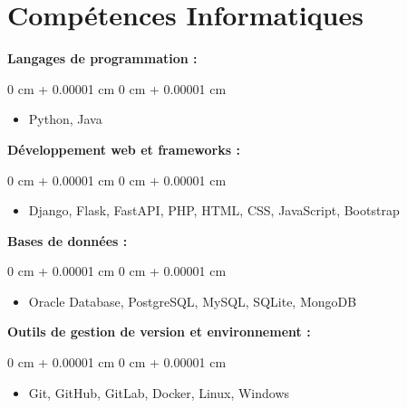 \documentclass[10pt, letterpaper]{article}
\newenvironment{highlights}{
    \begin{itemize}[
        topsep=0.10 cm,
        parsep=0.10 cm,
        partopsep=0pt,
        itemsep=0pt,
        leftmargin=0 cm + 10pt
    ]
}{
    \end{itemize}
} %
\newenvironment{onecolentry}{
    \begin{adjustwidth}{
        0 cm + 0.00001 cm
    }{
        0 cm + 0.00001 cm
    }
}{
    \end{adjustwidth}
} %
\begin{document}
    \section{Compétences Informatiques}
        
        \textbf{Langages de programmation :}

        \vspace{0.10 cm}
        \begin{onecolentry}
            \begin{highlights}
                \item Python, Java
            \end{highlights}
        \end{onecolentry}
        
        \vspace{0.2 cm}
        
        
        \textbf{Développement web et frameworks :}
        
        \vspace{0.10 cm}
        \begin{onecolentry}
        	\begin{highlights}
        		\item Django, Flask, FastAPI, PHP, HTML, CSS, JavaScript, Bootstrap
        	\end{highlights}
        \end{onecolentry}
        
        \vspace{0.2 cm}
        
        
        \textbf{Bases de données :}

		\vspace{0.10 cm}
		\begin{onecolentry}
			\begin{highlights}
				\item Oracle Database, PostgreSQL, MySQL, SQLite, MongoDB
			\end{highlights}
		\end{onecolentry}
		
		\vspace{0.2 cm}
		
		
		\textbf{Outils de gestion de version et environnement :}
		
		\vspace{0.10 cm}
		\begin{onecolentry}
			\begin{highlights}
				\item Git, GitHub, GitLab, Docker, Linux, Windows
			\end{highlights}
		\end{onecolentry}
		
\end{document}
